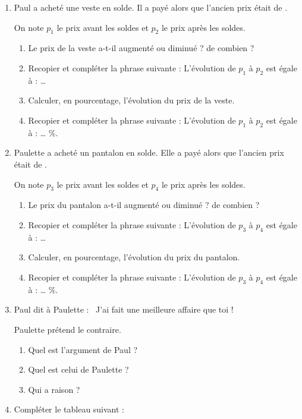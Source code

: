 \documentclass[10pt,openright,twoside,french]{book}
\begin{document}

\begin{enumerate}
    \item Paul a acheté une veste en solde. Il a payé  alors que l'ancien prix était de .\par On note $p_1$ le prix avant les soldes et $p_2$ le prix après les soldes.
        \begin{enumerate}
            \item Le prix de la veste a-t-il augmenté ou diminué ? de combien ?
            \item Recopier et compléter la phrase suivante : {\cursive L'évolution de $p_1$ à $p_2$ est égale à : \ldots}
            \item Calculer, en pourcentage, l'évolution du prix de la veste.
            \item Recopier et compléter la phrase suivante : {\cursive L'évolution de $p_1$ à $p_2$ est égale à : \ldots} \%.
        \end{enumerate}\medskip
    \item Paulette a acheté un pantalon en solde. Elle a payé  alors que l'ancien prix était de .\par On note $p_3$ le prix avant les soldes et $p_4$ le prix après les soldes.
        \begin{enumerate}
            \item Le prix du pantalon a-t-il augmenté ou diminué ? de combien ?
            \item Recopier et compléter la phrase suivante : {\cursive L'évolution de $p_3$ à $p_4$ est égale à : \ldots}
            \item Calculer, en pourcentage, l'évolution du prix du pantalon.
            \item Recopier et compléter la phrase suivante : {\cursive L'évolution de $p_3$ à $p_4$ est égale à : \ldots} \%.
        \end{enumerate}\medskip
    \item Paul dit à Paulette : \og~J'ai fait une meilleure affaire que toi !~\fg\par Paulette prétend le contraire.
        \begin{enumerate}
            \item Quel est l'argument de Paul ?
            \item Quel est celui de Paulette ?
            \item Qui a raison ?
        \end{enumerate}
    \item Compléter le tableau suivant :


\end{enumerate}
\end{document}
